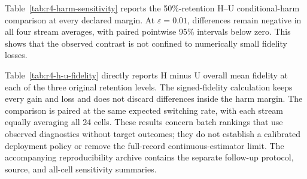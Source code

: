 \documentclass[11pt]{article}
\numberwithin{equation}{section}
\begin{document}
Table~\ref{tab:r4-harm-sensitivity} reports the 50\%-retention
H--U conditional-harm comparison at every declared margin.  At
$\varepsilon=0.01$, differences remain negative in all four stream
averages, with paired pointwise 95\% intervals below zero.
This shows that the observed contrast is not confined to numerically
small fidelity losses.

Table~\ref{tab:r4-h-u-fidelity} directly reports H minus U overall
mean fidelity at each of the three original retention levels.
The signed-fidelity calculation keeps every gain and loss and does not
discard differences inside the harm margin.  The comparison is paired
at the same expected switching rate, with each stream equally averaging
all 24 cells.  These results concern batch rankings that use observed
diagnostics without target outcomes; they do not establish a calibrated
deployment policy or remove the full-record continuous-estimator limit.
The accompanying reproducibility archive contains the separate follow-up
protocol, source, and all-cell sensitivity summaries.


\end{document}
